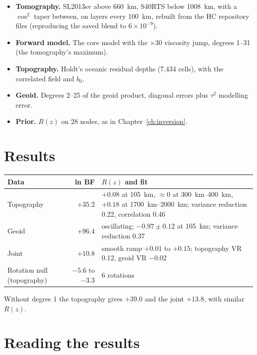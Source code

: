\begin{itemize}[nosep]
\item \textbf{Tomography.} SL2013sv \citep{schaeffer2013global} above \qty{660}{km}, S40RTS \citep{ritsema_s40rts_2011} below \qty{1008}{km}, with a $\cos^2$ taper between, on layers every \qty{100}{km}, rebuilt from the HC repository files (reproducing the saved blend to $6\times10^{-9}$).
\item \textbf{Forward model.} The core model with the $\times30$ viscosity jump, degrees 1--31 (the tomography's maximum).
\item \textbf{Topography.} Holdt's oceanic residual depths (7,434 cells), with the correlated field and $b_0$.
\item \textbf{Geoid.} Degrees 2--25 of the geoid product, diagonal errors plus $\tau^2$ modelling error.
\item \textbf{Prior.} $R(z)$ on 28 nodes, as in Chapter~\ref{ch:inversion}.
\end{itemize}

\section{Results}

\begin{center}
\begin{tabular}{lrp{}}
\toprule
Data & ln BF & $R(z)$ and fit\\
\midrule
Topography & $+35.2$ & $+0.08$ at \qty{105}{km}, $\approx0$ at \qtyrange{300}{400}{km}, $+0.18$ at \qtyrange{1700}{2000}{km}; variance reduction 0.22, correlation 0.46\\
Geoid & $+96.4$ & oscillating; $-0.97\pm0.12$ at \qty{105}{km}; variance reduction 0.37\\
Joint & $+10.8$ & smooth ramp $+0.01$ to $+0.15$; topography VR 0.12, geoid VR $-0.02$\\
Rotation null (topography) & $-5.6$ to $-3.3$ & 6 rotations\\
\bottomrule
\end{tabular}
\end{center}

Without degree 1 the topography gives $+39.0$ and the joint $+13.8$, with similar $R(z)$.

\section{Reading the results}

